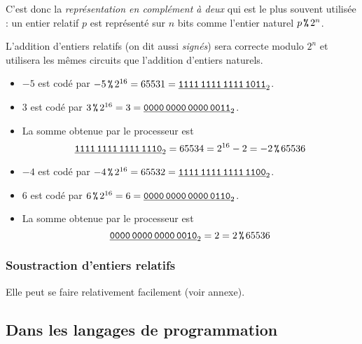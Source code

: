 C'est donc la \emph{représentation en complément à deux} qui est le plus souvent utilisée : un entier relatif $p$ est représenté sur $n$ bits comme l'entier naturel $p\operatorname{\texttt{\%}} 2^n$. 

\begin{rem}
  L'addition d'entiers relatifs (on dit aussi \emph{signés}) sera correcte modulo $2^{n}$ et utilisera les mêmes circuits que l'addition d'entiers naturels.
\end{rem}
\begin{exemple}
\begin{itemize}
\item[\textbullet] $-5$ est codé par $-5 \operatorname{\texttt{\%}} 2^{16} = 65531 =
  \underline{\text{\texttt{1111\,1111\,1111\,1011}}}_{2}$.
\item[\textbullet] $3$ est codé par $3 \operatorname{\texttt{\%}} 2^{16} = 3 =
  \underline{\text{\texttt{0000\,0000\,0000\,0011}}}_{2}$.
\item[\textbullet] La somme obtenue par le processeur est
  \begin{equation*}
    \underline{\text{\texttt{1111\,1111\,1111\,1110}}}_{2} = 65534 = 2^{16}-2 = -2 \operatorname{\texttt{\%}} 65536
  \end{equation*}
\end{itemize}
\end{exemple}
\begin{exemple}
\begin{itemize}
\item[\textbullet] $-4$ est codé par $-4 \operatorname{\texttt{\%}} 2^{16} = 65532 =
  \underline{\text{\texttt{1111\,1111\,1111\,1100}}}_{2}$.
\item[\textbullet] $6$ est codé par $6 \operatorname{\texttt{\%}} 2^{16} = 6 =
  \underline{\text{\texttt{0000\,0000\,0000\,0110}}}_{2}$.
\item[\textbullet] La somme obtenue par le processeur est
  \begin{equation*}
   \underline{\text{\texttt{0000\,0000\,0000\,0010}}}_{2} = 2 = 2 \operatorname{\texttt{\%}} 65536
  \end{equation*}
\end{itemize}
\end{exemple}

\subsubsection{Soustraction d'entiers relatifs}

Elle peut se faire relativement facilement (voir annexe).



\subsection{Dans les langages de programmation}

